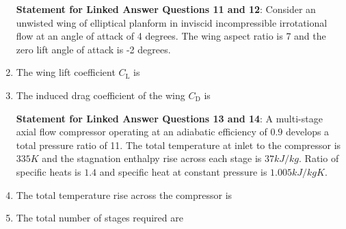 \documentclass[journal,12pt,onecolumn]{IEEEtran}
\theoremstyle{remark}
\begin{document}
\begin{enumerate}
\textbf{Statement for Linked Answer Questions 11 and 12}: Consider an unwisted wing of elliptical planform in inviscid incompressible irrotational flow at an angle of attack of 4 degrees. The wing aspect ratio is 7 and the zero lift angle of attack is -2 degrees.

\item The wing lift coefficient $C_{\text{L}}$ is 
\begin{enumerate}
\end{enumerate}
\item The induced drag coefficient of the wing $C_{\text{D}}$ is
\begin{enumerate}
\end{enumerate}

\textbf{Statement for Linked Answer Questions 13 and 14}: A multi-stage axial flow compressor operating at an adiabatic efficiency of $0.9$ develops a total pressure ratio of 11. The total temperature at inlet to the compressor is $335K$ and the stagnation enthalpy rise across each stage is $37 kJ/kg$. Ratio of specific heats is $1.4$ and specific heat at constant pressure is $1.005 kJ/kg K$.
\item The total temperature rise across the compressor is
\begin{enumerate}
\end{enumerate}

\item The total number of stages required are
\begin{enumerate}
\end{enumerate}


\end{enumerate}
\end{document}
